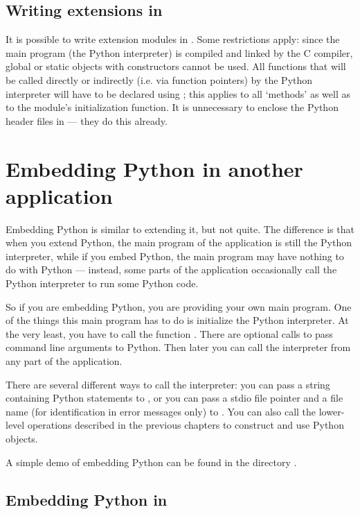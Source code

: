 \section{Writing extensions in \Cpp{}}

It is possible to write extension modules in \Cpp{}.  Some restrictions
apply: since the main program (the Python interpreter) is compiled and
linked by the C compiler, global or static objects with constructors
cannot be used.  All functions that will be called directly or
indirectly (i.e. via function pointers) by the Python interpreter will
have to be declared using ; this applies to all
`methods' as well as to the module's initialization function.
It is unnecessary to enclose the Python header files in
 --- they do this already.


\chapter{Embedding Python in another application}

Embedding Python is similar to extending it, but not quite.  The
difference is that when you extend Python, the main program of the
application is still the Python interpreter, while if you embed
Python, the main program may have nothing to do with Python ---
instead, some parts of the application occasionally call the Python
interpreter to run some Python code.

So if you are embedding Python, you are providing your own main
program.  One of the things this main program has to do is initialize
the Python interpreter.  At the very least, you have to call the
function .  There are optional calls to pass command
line arguments to Python.  Then later you can call the interpreter
from any part of the application.

There are several different ways to call the interpreter: you can pass
a string containing Python statements to , or you
can pass a stdio file pointer and a file name (for identification in
error messages only) to .  You can also call the
lower-level operations described in the previous chapters to construct
and use Python objects.

A simple demo of embedding Python can be found in the directory
.


\section{Embedding Python in \Cpp{}}

